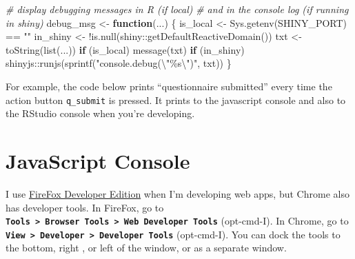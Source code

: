 \documentclass[
  oneside]{book}
\newenvironment{Shaded}{\begin{snugshade}}{\end{snugshade}}
\newcommand{\CommentTok}[1]{\textcolor[rgb]{0.56,0.35,0.01}{\textit{#1}}}
\newcommand{\ControlFlowTok}[1]{\textcolor[rgb]{0.13,0.29,0.53}{\textbf{#1}}}
\newcommand{\FunctionTok}[1]{\textcolor[rgb]{0.00,0.00,0.00}{#1}}
\newcommand{\NormalTok}[1]{#1}
\newcommand{\OtherTok}[1]{\textcolor[rgb]{0.56,0.35,0.01}{#1}}
\newcommand{\SpecialCharTok}[1]{\textcolor[rgb]{0.00,0.00,0.00}{#1}}
\newcommand{\StringTok}[1]{\textcolor[rgb]{0.31,0.60,0.02}{#1}}
\begin{document}
\begin{Shaded}
\begin{Highlighting}[]
\CommentTok{\# display debugging messages in R (if local) }
\CommentTok{\# and in the console log (if running in shiny)}
\NormalTok{debug\_msg }\OtherTok{\textless{}{-}} \ControlFlowTok{function}\NormalTok{(...) \{}
\NormalTok{  is\_local }\OtherTok{\textless{}{-}} \FunctionTok{Sys.getenv}\NormalTok{(}\StringTok{\textquotesingle{}SHINY\_PORT\textquotesingle{}}\NormalTok{) }\SpecialCharTok{==} \StringTok{""}
\NormalTok{  in\_shiny }\OtherTok{\textless{}{-}} \SpecialCharTok{!}\FunctionTok{is.null}\NormalTok{(shiny}\SpecialCharTok{::}\FunctionTok{getDefaultReactiveDomain}\NormalTok{())}
\NormalTok{  txt }\OtherTok{\textless{}{-}} \FunctionTok{toString}\NormalTok{(}\FunctionTok{list}\NormalTok{(...))}
  \ControlFlowTok{if}\NormalTok{ (is\_local) }\FunctionTok{message}\NormalTok{(txt)}
  \ControlFlowTok{if}\NormalTok{ (in\_shiny) shinyjs}\SpecialCharTok{::}\FunctionTok{runjs}\NormalTok{(}\FunctionTok{sprintf}\NormalTok{(}\StringTok{"console.debug(}\SpecialCharTok{\textbackslash{}"}\StringTok{\%s}\SpecialCharTok{\textbackslash{}"}\StringTok{)"}\NormalTok{, txt))}
\NormalTok{\}}
\end{Highlighting}
\end{Shaded}

For example, the code below prints ``questionnaire submitted'' every time the action button \texttt{q\_submit} is pressed. It prints to the javascript console and also to the RStudio console when you're developing.

\begin{Shaded}
\end{Shaded}

\hypertarget{javascript-console}{%
\section{JavaScript Console}\label{javascript-console}}

I use \href{https://www.mozilla.org/en-US/firefox/developer/}{FireFox Developer Edition} when I'm developing web apps, but Chrome also has developer tools. In FireFox, go to \textbf{\texttt{Tools\ \textgreater{}\ Browser\ Tools\ \textgreater{}\ Web\ Developer\ Tools}} (opt-cmd-I). In Chrome, go to \textbf{\texttt{View\ \textgreater{}\ Developer\ \textgreater{}\ Developer\ Tools}} (opt-cmd-I). You can dock the tools to the bottom, right , or left of the window, or as a separate window.
\end{document}
